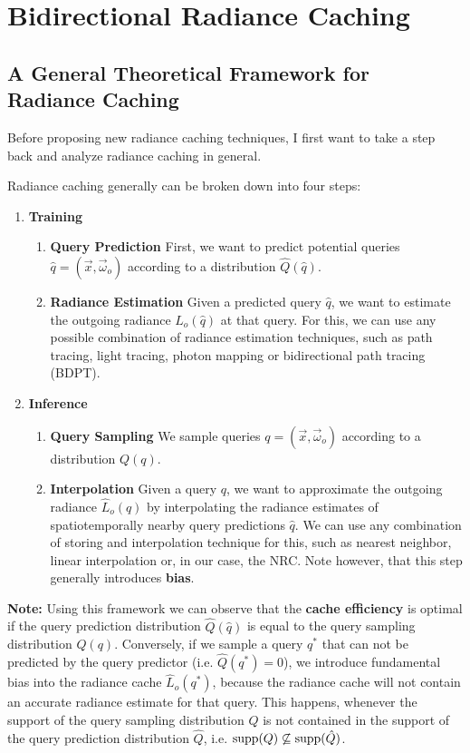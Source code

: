 
\chapter{Bidirectional Radiance Caching}
\label{chap:bidirectional_caching}

\section{A General Theoretical Framework for Radiance Caching}
Before proposing new radiance caching techniques, I first want to take a step back and analyze radiance caching in general.

Radiance caching generally can be broken down into four steps:

\begin{enumerate}
    \item \textbf{Training}
    \begin{enumerate}
        \item \textbf{Query Prediction} First, we want to predict potential queries $\hat{q} = (\vec{x}, \vec{\omega}_o)$ according to a distribution $\hat{Q}(\hat{q})$.
        \item \textbf{Radiance Estimation} Given a predicted query $\hat{q}$, we want to estimate the outgoing radiance $L_o(\hat{q})$ at that query.
        For this, we can use any possible combination of radiance estimation techniques, such as path tracing, light tracing, photon mapping or bidirectional path tracing (BDPT).
    \end{enumerate}
    \item \textbf{Inference}
    \begin{enumerate}
        \item \textbf{Query Sampling} We sample queries $q = (\vec{x}, \vec{\omega}_o)$ according to a distribution $Q(q)$.
        \item \textbf{Interpolation} Given a query $q$, we want to approximate the outgoing radiance $\hat{L}_o(q)$ by interpolating the radiance estimates of spatiotemporally nearby query predictions $\hat{q}$.
        We can use any combination of storing and interpolation technique for this, such as nearest neighbor, linear interpolation or, in our case, the NRC.
        Note however, that this step generally introduces \textbf{bias}.
    \end{enumerate}
\end{enumerate}

\textbf{Note:} Using this framework we can observe that the \textbf{cache efficiency} is optimal if the query prediction distribution $\hat{Q}(\hat{q})$ is equal to the query sampling distribution $Q(q)$.
Conversely, if we sample a query $q^*$ that can not be predicted by the query predictor (i.e. $\hat{Q}(q^*)=0$), we introduce fundamental bias into the radiance cache $\hat{L}_o(q^*)$, because the radiance cache will not contain an accurate radiance estimate for that query.
This happens, whenever the support of the query sampling distribution $Q$ is not contained in the support of the query prediction distribution $\hat{Q}$, i.e. $\operatorname{\mathrm{supp}}(Q) \not\subseteq \operatorname{\mathrm{supp}}(\hat{Q})$.

